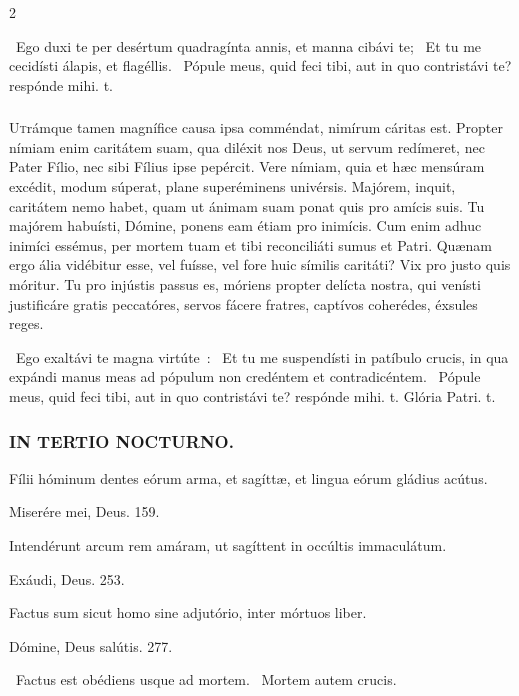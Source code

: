 \documentclass[9pt,twoside]{extarticle}
\begin{document}
\begin{multicols}{2}
{\begin{tightlist}{}
\item {}~Ego duxi te per desértum quadragínta annis, et manna cibávi te; \textred{*}~Et tu me cecidísti álapis, et flagéllis. ~Pópule meus, quid feci tibi, aut in quo contristávi te? respónde mihi. t.
\end{tightlist}

\subsubsection*{\center {}}
\lettrine{U}trámque tamen magnífice causa ipsa comméndat, nimírum cáritas est. Propter nímiam enim caritátem suam, qua diléxit nos Deus, ut servum redímeret, nec Pater Fílio, nec sibi Fílius ipse pepércit. Vere nímiam, quia et hæc mensúram excédit, modum súperat, plane superéminens univérsis. Majórem, inquit, caritátem nemo habet, quam ut ánimam suam ponat quis pro amícis suis. Tu majórem habuísti, Dómine, ponens eam étiam pro inimícis. Cum enim adhuc inimíci essémus, per mortem tuam et tibi reconciliáti sumus et Patri. Quænam ergo ália vidébitur esse, vel fuísse, vel fore huic símilis caritáti? Vix pro justo quis móritur. Tu pro injústis passus es, móriens propter delícta nostra, qui venísti justificáre gratis peccatóres, servos fácere fratres, captívos coherédes, éxsules reges.

\begin{tightlist}{}
\item {}~Ego exaltávi te magna virtúte~: \textred{*}~Et tu me suspendísti in patíbulo crucis, in qua expándi manus meas ad pópulum non credéntem et contradicéntem. ~Pópule meus, quid feci tibi, aut in quo contristávi te? respónde mihi. t. Glória Patri. t.
\end{tightlist}

\subsubsection*{\center \textsc{IN TERTIO NOCTURNO.}}
\begin{tightlist}{}
\item {} Fílii hóminum dentes eórum arma, et sagíttæ, et lingua eórum gládius acútus. 
\item {} Miserére mei, Deus. 159.
\item {} Intendérunt arcum rem amáram, ut sagíttent in occúltis immaculátum.
\item {} Exáudi, Deus. 253.
\item {} Factus sum sicut homo sine adjutório, inter mórtuos liber.
\item {} Dómine, Deus salútis. 277.
\item {}~Factus est obédiens usque ad mortem. ~Mortem autem crucis.
\end{tightlist}

}
\end{multicols}
\end{document}
